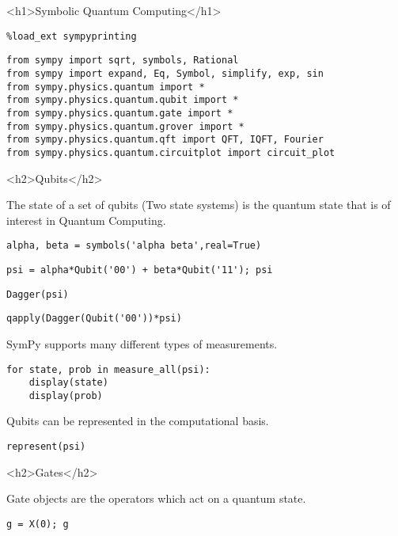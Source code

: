 <h1>Symbolic Quantum Computing</h1>

\begin{verbatim}
%load_ext sympyprinting
\end{verbatim}

\begin{verbatim}
from sympy import sqrt, symbols, Rational
from sympy import expand, Eq, Symbol, simplify, exp, sin
from sympy.physics.quantum import *
from sympy.physics.quantum.qubit import *
from sympy.physics.quantum.gate import *
from sympy.physics.quantum.grover import *
from sympy.physics.quantum.qft import QFT, IQFT, Fourier
from sympy.physics.quantum.circuitplot import circuit_plot
\end{verbatim}

<h2>Qubits</h2>

The state of a set of qubits (Two state systems) is the quantum state that is of
interest in Quantum Computing.

\begin{verbatim}
alpha, beta = symbols('alpha beta',real=True)
\end{verbatim}

\begin{verbatim}
psi = alpha*Qubit('00') + beta*Qubit('11'); psi
\end{verbatim}

\begin{verbatim}
Dagger(psi)
\end{verbatim}

\begin{verbatim}
qapply(Dagger(Qubit('00'))*psi)
\end{verbatim}

SymPy supports many different types of measurements.

\begin{verbatim}
for state, prob in measure_all(psi):
    display(state)
    display(prob)
\end{verbatim}

Qubits can be represented in the computational basis.

\begin{verbatim}
represent(psi)
\end{verbatim}

<h2>Gates</h2>

Gate objects are the operators which act on a quantum state.

\begin{verbatim}
g = X(0); g
\end{verbatim}

